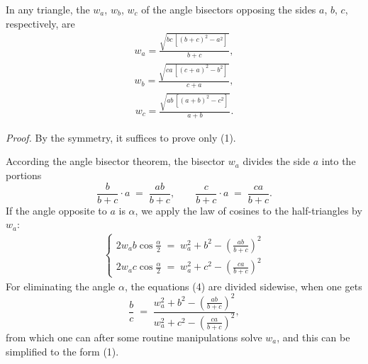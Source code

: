 \documentclass[12pt]{article}
\theoremstyle{definition}
\begin{document}
In any triangle, the  $w_a$, $w_b$, $w_c$ of the angle bisectors opposing the sides $a$, $b$, $c$, respectively, are
\begin{align}
w_a = \frac{\sqrt{bc\,[(b\!+\!c)^2\!-\!a^2]\,}}{b\!+\!c},
\end{align}
\begin{align}
w_b = \frac{\sqrt{ca\,[(c\!+\!a)^2\!-\!b^2]\,}}{c\!+\!a},
\end{align}
\begin{align}
w_c = \frac{\sqrt{ab\,[(a\!+\!b)^2\!-\!c^2]\,}}{a\!+\!b}.
\end{align}

{\em Proof.}\; By the symmetry, it suffices to prove only (1).

According the angle bisector theorem, the bisector $w_a$ divides the side $a$ into the portions 
$$\frac{b}{b\!+\!c}\cdot a \;=\; \frac{ab}{b\!+\!c}, \qquad \frac{c}{b\!+\!c}\cdot a \;=\; \frac{ca}{b\!+\!c}.$$
If the angle opposite to $a$ is $\alpha$, we apply the law of cosines to the half-triangles  by $w_a$:
\begin{align}
\begin{cases}
2w_ab\cos\frac{\alpha}{2} \;=\; w_a^2\!+\!b^2\!-\!\left(\frac{ab}{b+c}\right)^2\\
2w_ac\cos\frac{\alpha}{2} \;=\; w_a^2\!+\!c^2\!-\!\left(\frac{ca}{b+c}\right)^2
\end{cases}
\end{align}
For eliminating the angle $\alpha$, the equations (4) are divided sidewise, when one gets
$$\frac{b}{c} \;=\; \frac{w_a^2\!+\!b^2\!-\!\left(\frac{ab}{b+c}\right)^2}{w_a^2\!+\!c^2\!-\!\left(\frac{ca}{b+c}\right)^2},$$
from which one can after some routine manipulations solve $w_a$, and this can be simplified to the form (1).


\end{document}
